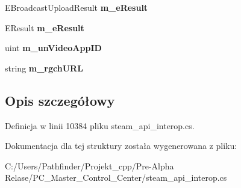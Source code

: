 \begin{DoxyCompactItemize}
E\+Broadcast\+Upload\+Result {\bfseries m\+\_\+e\+Result}
\item 
\mbox{\label{struct_valve_1_1_steamworks_1_1_steam_callback__t_a2079ca6e028bc9d0118ad3aa13e108ba}} 
E\+Result {\bfseries m\+\_\+e\+Result}
\item 
\mbox{\label{struct_valve_1_1_steamworks_1_1_steam_callback__t_a3dd503c4bab2d238dbac3ef8e261d3f4}} 
uint {\bfseries m\+\_\+un\+Video\+App\+ID}
\item 
\mbox{\label{struct_valve_1_1_steamworks_1_1_steam_callback__t_a8940b4daad5395123bf89bc53ab2fcb0}} 
string {\bfseries m\+\_\+rgch\+U\+RL}
\end{DoxyCompactItemize}


\subsection{Opis szczegółowy}


Definicja w linii 10384 pliku steam\+\_\+api\+\_\+interop.\+cs.



Dokumentacja dla tej struktury została wygenerowana z pliku\+:\begin{DoxyCompactItemize}
\item 
C\+:/\+Users/\+Pathfinder/\+Projekt\+\_\+cpp/\+Pre-\/\+Alpha Relase/\+P\+C\+\_\+\+Master\+\_\+\+Control\+\_\+\+Center/steam\+\_\+api\+\_\+interop.\+cs\end{DoxyCompactItemize}
